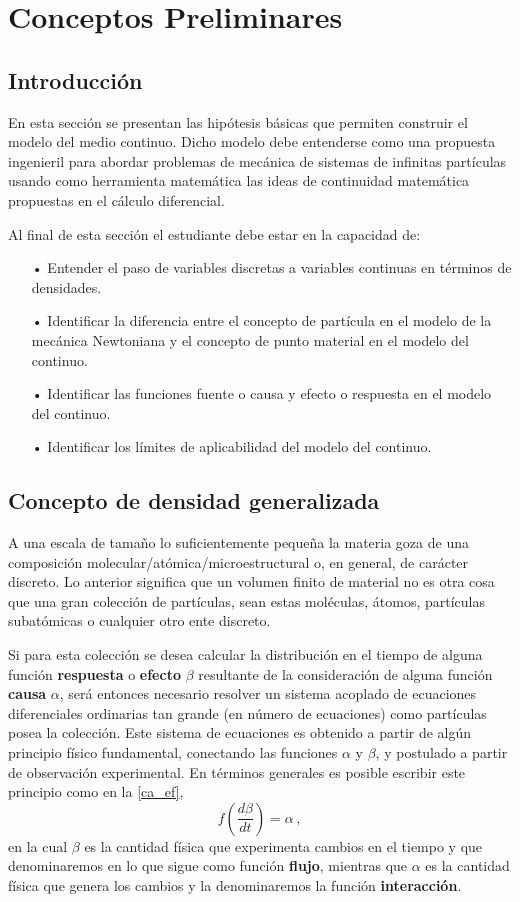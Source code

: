 \documentclass[../notas medios.tex]{subfiles}
\begin{document}
\chapter{Conceptos Preliminares}

\graphicspath{{img/Cap1/}}

\section{Introducción}
En esta sección se presentan las hipótesis básicas que permiten construir el modelo del medio continuo. Dicho modelo debe entenderse como una propuesta ingenieril para abordar problemas de mecánica de sistemas de infinitas partículas usando como herramienta matemática las ideas de continuidad matemática propuestas en el cálculo diferencial.

Al final de esta sección el estudiante debe estar en la capacidad de:
\begin{itemize}
\item[•] Entender el paso de variables discretas a variables continuas en términos de densidades.
\item[•] Identificar la diferencia entre el concepto de partícula en el modelo de la mecánica Newtoniana y el concepto de punto material en el modelo del continuo.
\item[•] Identificar las funciones fuente o causa y efecto o respuesta en el modelo del continuo.
\item[•] Identificar los límites de aplicabilidad del modelo del continuo.
\end{itemize}

\section{Concepto de densidad generalizada}
A una escala de tamaño lo suficientemente pequeña la materia goza de una composición molecular/atómica/microestructural o, en general, de carácter discreto. Lo anterior significa que un volumen finito de material no es otra cosa que una gran colección de partículas, sean estas moléculas, átomos, partículas subatómicas o cualquier otro ente discreto.

Si para esta colección se desea calcular la distribución en el tiempo de alguna función {\bf respuesta} o {\bf efecto} $\beta$ resultante de la consideración de alguna función {\bf causa} $\alpha$, será entonces necesario resolver un sistema acoplado de ecuaciones diferenciales ordinarias tan grande (en número de ecuaciones) como partículas posea la colección. Este sistema de ecuaciones es obtenido a partir de algún principio físico fundamental, conectando las funciones $\alpha$ y $\beta$, y postulado a partir de observación experimental. En términos generales es posible escribir este principio como en la \cref{ca_ef},
\begin{equation}
f\left(\frac{d\beta}{dt} \right) = \alpha\, ,
\label{ca_ef}
\end{equation}
en la cual $\beta$ es la cantidad física que experimenta cambios en el
tiempo y que denominaremos en lo que sigue como función {\bf flujo}, mientras que $\alpha$ es la cantidad física que genera los cambios y la denominaremos la función {\bf interacción}.
\end{document}
